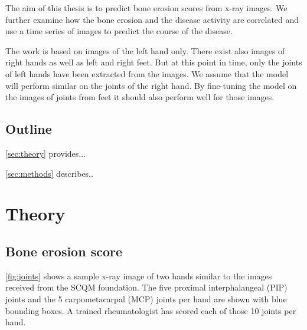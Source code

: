 \documentclass[12pt]{article}
\begin{document}
The aim of this thesis is to predict bone erosion scores from x-ray images. We further examine how the bone erosion and the disease activity are correlated and use a time series of images to predict the course of the disease.

The work is based on images of the left hand only. There exist also images of right hands as well as left and right feet. But at this point in time, only the joints of left hands have been extracted from the images. We assume that the model will perform similar on the joints of the right hand. By fine-tuning the model on the images of joints from feet it should also perform well for those images.



\subsection{Outline}

\autoref{sec:theory} provides...

\noindent\autoref{sec:methods} describes..



\newpage

\section{Theory}
\label{sec:theory}

\subsection{Bone erosion score}
\label{subsec:bone_erosion}

\autoref{fig:joints} shows a sample x-ray image of two hands similar to the images received from the SCQM foundation. The five proximal interphalangeal (PIP) joints and the 5 carpometacarpal (MCP) joints per hand are shown with blue bounding boxes. A trained rheumatologist has scored each of those 10 joints per hand.
\end{document}
